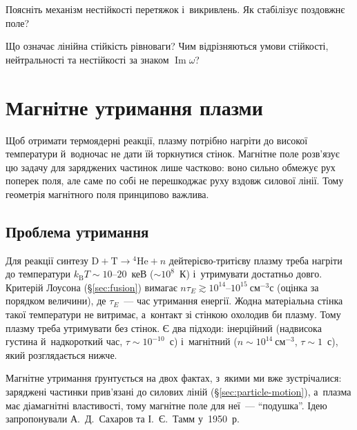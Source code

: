 \begin{Questions}
\begin{quizlist}
\item Поясніть механізм нестійкості перетяжок і~викривлень. Як стабілізує
		  поздовжнє поле?

\item Що означає лінійна стійкість рівноваги? Чим відрізняються умови
стійкості, нейтральності та нестійкості за знаком $\operatorname{Im}\omega$?

\end{quizlist}
\end{Questions}

\chapter{Магнітне утримання плазми}\label{sec:magnetic-confinement}\hypertarget{magnetic-confinement}{}

Щоб отримати термоядерні реакції, плазму потрібно нагріти до високої температури
й~водночас не дати їй торкнутися стінок. Магнітне поле розв'язує цю задачу для заряджених
частинок лише частково: воно сильно обмежує рух поперек поля, але саме по собі не
перешкоджає руху вздовж силової лінії. Тому геометрія магнітного поля принципово важлива.



\section{Проблема утримання}



Для реакції синтезу $\mathrm D+\mathrm T\to{}^4\mathrm{He}+n$ дейтерієво-тритієву плазму
треба нагріти до температури $k_{\mathrm B}T\sim10$--$20$~кеВ ($\sim10^8$~К) і~утримувати
достатньо довго. Критерій Лоусона (§\ref{sec:fusion}) вимагає
$n\tau_E\gtrsim10^{14}$--$10^{15}~\mathrm{см}^{-3}\mathrm{с}$ (оцінка за порядком
величини), де $\tau_E$~--- час утримання енергії. Жодна матеріальна стінка такої
температури не витримає, а~контакт зі стінкою охолодив би плазму. Тому плазму треба
утримувати без стінок. Є два підходи: інерційний (надвисока густина й~надкороткий час,
$\tau\sim10^{-10}$~с) і~магнітний ($n\sim10^{14}~\mathrm{см}^{-3}$, $\tau\sim1$~с), який
розглядається нижче.

Магнітне утримання ґрунтується на двох фактах, з~якими ми вже зустрічалися: заряджені
частинки прив'язані до силових ліній (§\ref{sec:particle-motion}), а~плазма має
діамагнітні властивості, тому магнітне поле для неї~--- \enquote{подушка}. Ідею
запропонували А.~Д.~Сахаров та І.~Є.~Тамм у~1950~р.

